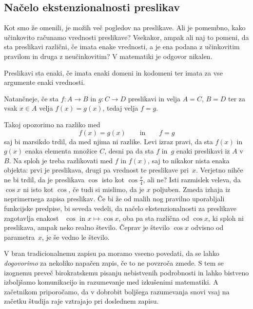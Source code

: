 \subsection{Načelo ekstenzionalnosti preslikav}

Kot smo že omenili, je možih več pogledov na preslikave. Ali je pomembno, kako učinkovito
računamo vrednosti preslikave? Vsekakor, ampak ali naj to pomeni, da sta preslikavi
različni, če imata enake vrednosti, a je ena podana z učinkovitim pravilom in druga z
neučinkovitim? V matematiki je odgovor nikalen.

\begin{pravilo}
  Preslikavi sta enaki, če imata enaki domeni in kodomeni ter imata za vse argumente
  enaki vrednosti.
\end{pravilo}

Natančneje, če sta $f : A \to B$ in $g : C \to D$ preslikavi in velja $A = C$, $B = D$ ter
za vsak $x \in A$ velja $f(x) = g(x)$, tedaj velja $f = g$.

Takoj opozorimo na razliko med
%
\begin{equation*}
  f(x) = g(x)
  \qquad\text{in}\qquad
  f = g
\end{equation*}
%
saj bi marsikdo trdil, da med njima ni razlike. Levi izraz pravi, da sta $f(x)$ in $g(x)$
enaka elementa množice $C$, desni pa da sta $f$ in~$g$ enaki preslikavi iz $A$ v $B$. Na
sploh je treba razlikovati med $f$ in $f(x)$, saj to nikakor nista enaka objekta: prvi je
preslikava, drugi pa vrednost te preslikave pri~$x$. Verjetno nihče ne bi trdil, da je
preslikava $\cos$ isto kot $\cos \frac{\pi}{4}$, ali ne? Isti razmislek veleva, da
$\cos x$ ni isto kot $\cos$, če tudi si mislimo, da je $x$ poljuben. Zmeda izhaja iz
neprimernega zapisa preslikav. Če bi že od malih nog pravilno uporabljali funkcijske
predpise, bi seveda vedeli, da načelo ekstenzionalnosti za preslikave zagotavlja enakost
~$\cos$ in $x \mapsto \cos x$, oba pa sta različna od $\cos x$, ki sploh ni preslikava,
ampak neko realno število. Čeprav je število $\cos x$ odvisno od parametra~$x$, je še
vedno le število.

V bran tradicionalnemu zapisu pa moramo vseeno povedati, da se lahko \emph{dogovorimo} za
nekoliko napačen zapis, če to ne povzroča zmede. S tem se izognemu preveč birokratskemu
pisanju nebistvenih podrobnosti in lahko bistveno izboljšamo komunikacijo in razumevanje
med izkušenimi matematiki. A začetnikom priporočamo, da v dobrobit boljšega razumevanja
snovi vsaj na začetku študija raje vztrajajo pri doslednem zapisu.


